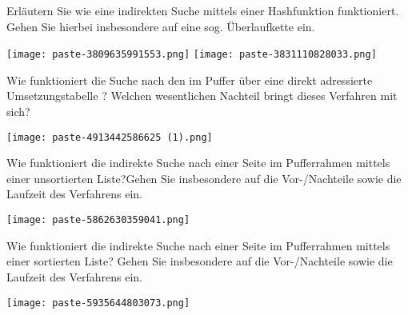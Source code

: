 \documentclass{article}
\begin{document}
\begin{tcolorbox}[colback=white!10!white,colframe=lightgray!75!black,
  savelowerto=\jobname_ex.tex]

\begin{center}
 Erläutern Sie wie eine indirekten Suche mittels einer Hashfunktion funktioniert. Gehen Sie hierbei insbesondere auf eine sog. Überlaufkette ein. 

\end{center}

\tcblower

\justifying
\texttt{[image: paste-3809635991553.png]}
\texttt{[image: paste-3831110828033.png]}

\end{tcolorbox}
\begin{tcolorbox}[colback=white!10!white,colframe=lightgray!75!black,
  savelowerto=\jobname_ex.tex]

\begin{center}
 Wie funktioniert die Suche nach den im Puffer über eine 
direkt adressierte 
Umsetzungstabelle
? Welchen wesentlichen Nachteil bringt dieses Verfahren mit sich? 

\end{center}

\tcblower

\justifying
\texttt{[image: paste-4913442586625 (1).png]}

\end{tcolorbox}
\begin{tcolorbox}[colback=white!10!white,colframe=lightgray!75!black,
  savelowerto=\jobname_ex.tex]

\begin{center}
 Wie funktioniert die indirekte Suche nach einer Seite im Pufferrahmen mittels einer 
unsortierten
 Liste?Gehen Sie insbesondere auf die Vor-/Nachteile sowie die Laufzeit des Verfahrens ein. 

\end{center}

\tcblower

\justifying
\texttt{[image: paste-5862630359041.png]}

\end{tcolorbox}
\begin{tcolorbox}[colback=white!10!white,colframe=lightgray!75!black,
  savelowerto=\jobname_ex.tex]

\begin{center}
 Wie funktioniert die indirekte Suche nach einer Seite im Pufferrahmen mittels einer
sortierten
 Liste? Gehen Sie insbesondere auf die Vor-/Nachteile sowie die Laufzeit des Verfahrens ein. 

\end{center}

\tcblower

\justifying
\texttt{[image: paste-5935644803073.png]}

\end{tcolorbox}
\end{document}
